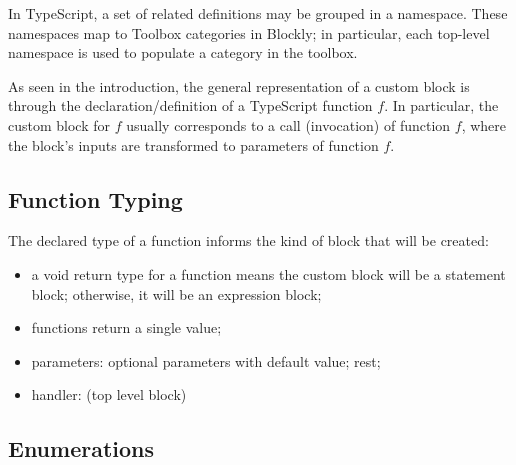 In TypeScript, a set of related definitions may be grouped in a namespace.
These namespaces map to Toolbox categories in Blockly;
in particular, each top-level namespace is used to populate a category 
in the toolbox. 

As seen in the introduction, 
the general representation of a custom block is through the declaration/definition
of a TypeScript function $f$.  In particular, the custom block for $f$ usually
corresponds to a call (invocation) of function $f$, where the block's inputs
are transformed to parameters of function $f$.

\subsection{Function Typing}

The declared type of a function informs the kind of block that will be created:
\begin{itemize}

  \item a void return type for a function means the custom block will be a statement
  block; otherwise, it will be an expression block;
  \item functions return a single value;
  \item parameters: optional parameters with default value; rest; 
  \item handler: (top level block)
\end{itemize}





\subsection{Enumerations}

